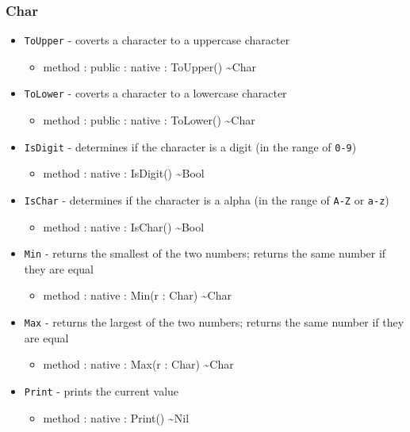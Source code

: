 \documentclass[11pt]{article}
\begin{document}
\subsubsection{Char}
\begin{itemize}
\item \texttt{ToUpper} - coverts a character to a uppercase character
  \begin{itemize}
  \item method : public : native : ToUpper() \textasciitilde Char
  \end{itemize}
\item \texttt{ToLower} - coverts a character to a lowercase character
  \begin{itemize}
  \item method : public : native : ToLower() \textasciitilde Char
  \end{itemize}
\item \texttt{IsDigit} - determines if the character is a digit (in
  the range of \texttt{0-9})
  \begin{itemize}
  \item method : native : IsDigit() \textasciitilde Bool
  \end{itemize}
\item \texttt{IsChar} - determines if the character is a alpha (in the
  range of \texttt{A-Z} or \texttt{a-z})
  \begin{itemize}
  \item method : native : IsChar() \textasciitilde Bool
  \end{itemize}
\item \texttt{Min} - returns the smallest of the two numbers; returns
  the same number if they are equal
  \begin{itemize}
  \item method : native : Min(r : Char) \textasciitilde Char
  \end{itemize}
\item \texttt{Max} - returns the largest of the two numbers; returns
  the same number if they are equal
  \begin{itemize}
  \item method : native : Max(r : Char) \textasciitilde Char
  \end{itemize}
\item \texttt{Print} - prints the current value
  \begin{itemize}
  \item method : native : Print() \textasciitilde Nil
  \end{itemize}

\end{itemize}
\end{document}
